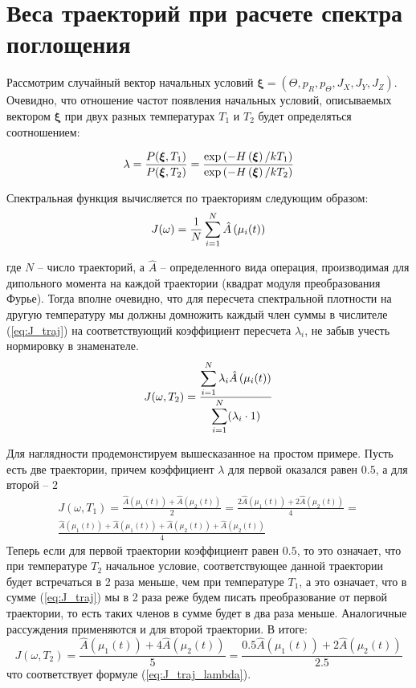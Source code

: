 \section{Веса траекторий при расчете спектра поглощения}

Рассмотрим случайный вектор начальных условий $\boldsymbol{\xi} = {(\Theta, p_R, p_{\Theta},J_X, J_Y, J_Z)}$. Очевидно, что отношение частот появления начальных условий, описываемых вектором $\boldsymbol{\xi}$ при двух разных температурах $T_1$ и $T_2$ будет определяться соотношением:

\begin{gather}
\lambda = \frac{P(\boldsymbol{\xi}, T_1)}{P(\boldsymbol{\xi}, T_2)} = \frac{\exp \left( - H \left( \boldsymbol{\xi} \right) / kT_1 \right)}{ \exp \left( -H \left( \boldsymbol{\xi} \right) / kT_2 \right)} \notag 
\end{gather}

Спектральная функция вычисляется по траекториям следующим образом:
\begin{gather}
J(\omega) = \frac{1}{N} \sum_{i=1}^{N} \hat{A} \left( \mu_i(t) \right) \label{eq:J_traj} 
\end{gather}

где $N$ -- число траекторий, а $\hat A$ -- определенного вида операция, производимая для дипольного момента на каждой траектории (квадрат модуля преобразования Фурье). Тогда вполне очевидно, что для пересчета спектральной плотности на другую температуру мы должны домножить каждый член суммы в числителе (\ref{eq:J_traj}) на соответствующий коэффициент пересчета $\lambda_i$, не забыв учесть нормировку в знаменателе.
\begin{gather}
J(\omega, T_2) = \frac{\displaystyle \sum_{i = 1}^{N} \lambda_i \hat{A} \left( \mu_i(t) \right)}{\displaystyle \sum_{i = 1}^{N}(\lambda_i \cdot 1) \label{eq:J_traj_lambda}}
\end{gather}

Для наглядности продемонстируем вышесказанное на простом примере. Пусть есть две траектории, причем коэффициент $\lambda$ для первой оказался равен $0.5$, а для второй -- $2$
\begin{equation*}
\begin{aligned}
J(\omega, T_1) = \frac{\hat A(\mu_1(t))+\hat A(\mu_2(t))}{2} = \frac{2\hat A(\mu_1(t))+2\hat A(\mu_2(t))}{4} = \\
\frac{\hat A(\mu_1(t))+\hat A(\mu_1(t))+\hat A(\mu_2(t))+\hat A(\mu_2(t))}{4}
\end{aligned}
\end{equation*}
Теперь если для первой траектории коэффициент равен $0.5$, то это означает, что при температуре $T_2$ начальное условие, соответствующее данной траектории будет встречаться в 2 раза меньше, чем при температуре $T_1$, а это означает, что в сумме (\ref{eq:J_traj}) мы в 2 раза реже будем писать преобразование от первой траектории, то есть таких членов в сумме будет в два раза меньше. Аналогичные рассуждения применяются и для второй траектории. В итоге:
\begin{equation*}
J(\omega, T_2) = \frac{\hat A(\mu_1(t))+4\hat A(\mu_2(t))}{5} = \frac{0.5\hat A(\mu_1(t))+2\hat A(\mu_2(t))}{2.5}
\end{equation*}
что соответствует формуле (\ref{eq:J_traj_lambda}).

